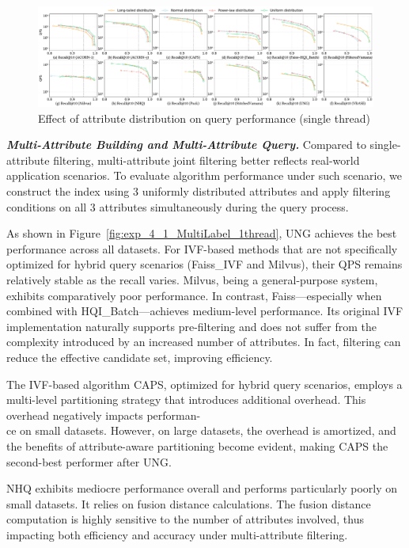 \documentclass[sigconf, nonacm]{acmart}
\begin{document}
	\begin{figure}
		\centering
		\setlength{\abovecaptionskip}{0.1cm}
		\setlength{\belowcaptionskip}{-0.4cm}
		\includegraphics[width=\textwidth]{figures/exp/exp_3_1.pdf}
		\caption{Effect of attribute distribution on query performance (single thread)}
		\label{fig:exp_3_1}
	\end{figure}
	
	
	
	
	
	\textit{\textbf{Multi-Attribute Building and Multi-Attribute Query.}}  
	Compared to single-attribute filtering, multi-attribute joint filtering better reflects real-world application scenarios. To evaluate algorithm performance under such scenario, we construct the index using 3 uniformly distributed attributes and apply filtering conditions on all 3 attributes simultaneously during the query process.
	
	As shown in Figure~\ref{fig:exp_4_1_MultiLabel_1thread}, UNG achieves the best performance across all datasets. For IVF-based methods that are not specifically optimized for hybrid query scenarios (Faiss\_IVF and Milvus), their QPS remains relatively stable as the recall varies. Milvus, being a general-purpose system, exhibits comparatively poor performance. In contrast, Faiss—especially when combined with HQI\_Batch—achieves medium-level performance. Its original IVF implementation naturally supports pre-filtering and does not suffer from the complexity introduced by an increased number of attributes. In fact, filtering can reduce the effective candidate set, improving efficiency.
	
	The IVF-based algorithm CAPS, optimized for hybrid query scenarios, employs a multi-level partitioning strategy that introduces additional overhead. This overhead negatively impacts performan-\\ce on small datasets. However, on large datasets, the overhead is amortized, and the benefits of attribute-aware partitioning become evident, making CAPS the second-best performer after UNG.
	
	NHQ exhibits mediocre performance overall and performs particularly poorly on small datasets. It relies on fusion distance calculations. The fusion distance computation is highly sensitive to the number of attributes involved, thus impacting both efficiency and accuracy under multi-attribute filtering.
	
\end{document}
